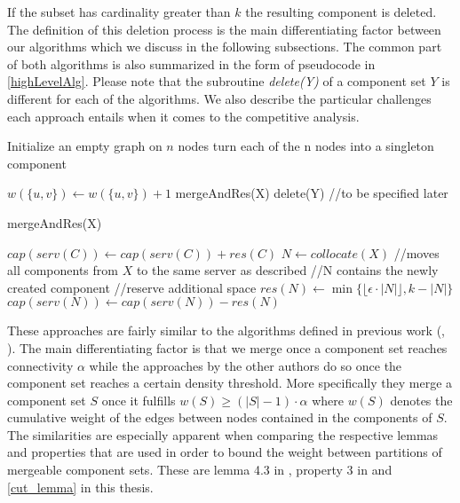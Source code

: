 \documentclass[a4paper,xcolor=dvipsnames, tikz, 12pt]{article}
\newcommand{\crep}{\text{C{\scriptsize REP}}}
\theoremstyle{definition}
\begin{document}
	If the subset has cardinality greater than $k$ the resulting component is deleted. The definition of this deletion process is the main differentiating factor between our algorithms which we discuss in the following subsections. The common part of both algorithms is also summarized in the form of pseudocode in \cref{highLevelAlg}. Please note that the subroutine \textit{delete(Y)} of a component set $Y$ is different for each of the algorithms. We also describe the particular challenges each approach entails when it comes to the competitive analysis.
	
	\begin{algorithm}[t]
		\caption{\crep{}}
		\label{highLevelAlg}
		\begin{algorithmic}
			\STATE Initialize an empty graph on $n$ nodes
			\STATE turn each of the n nodes into a singleton component
			
			\STATE $w(\{u,v\})\gets w(\{u,v\})+1$
			\ENDIF
			\STATE mergeAndRes(X) %
			\ENDIF
			\STATE delete(Y) //to be specified later
			\ENDIF	
			
			\ENDFOR
			
		\end{algorithmic}
	\end{algorithm}

\begin{algorithm}[t]
	\caption{mergeAndRes(X)}
	\label{mergeAndRes}
	\begin{algorithmic}
		\FORALL { $C\in X$}
		\STATE $cap(serv(C))\gets cap(serv(C))+res(C)$		
		\ENDFOR
		\STATE $N\gets collocate(X)$ //moves all components from $X$ to the same server as described
		\STATE //N contains the newly created component
		\IF {$|N|>2/\epsilon$}
		\STATE //reserve additional space
		\STATE $res(N)\gets\min\{\lfloor\epsilon\cdot|N|\rfloor,k-|N|\}$
		\STATE $cap(serv(N))\gets cap(serv(N))-res(N)$
		\ENDIF	
		
		
	\end{algorithmic}
\end{algorithm}
	
	These approaches are fairly similar to the algorithms defined in previous work (\cite{Avin2015}, \cite{Avin2016}). The main differentiating factor is that we merge once a component set reaches connectivity $\alpha$ while the approaches by the other authors do so once the component set reaches a certain density threshold. More specifically they merge a component set $S$ once it fulfills $w(S)\geq(|S|-1)\cdot\alpha$ where $w(S)$ denotes the cumulative weight of the edges between nodes contained in the components of $S$.
	The similarities are especially apparent when comparing the respective lemmas and properties that are used in order to bound the weight between partitions of mergeable component sets. These are lemma 4.3 in \cite{Avin2015}, property 3 in \cite{Avin2016} and \cref{cut_lemma} in this thesis.
	
\end{document}
